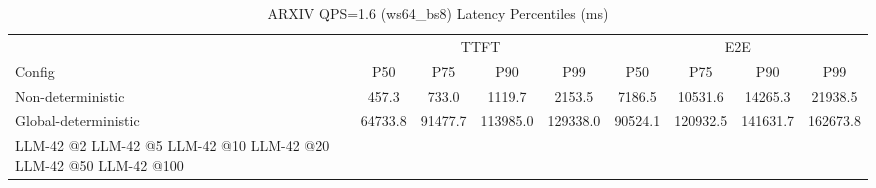 \begin{table}[htbp]
\centering
\caption{ARXIV QPS=1.6 (ws64_bs8) Latency Percentiles (ms)}
\label{tab:arxiv_qps1.6_ws64_bs8}
\begin{tabular}{l|cccc|cccc}
\toprule
& \multicolumn{4}{c|}{TTFT} & \multicolumn{4}{c}{E2E} \\
Config & P50 & P75 & P90 & P99 & P50 & P75 & P90 & P99 \\
\midrule
Non-deterministic & 457.3 & 733.0 & 1119.7 & 2153.5 & 7186.5 & 10531.6 & 14265.3 & 21938.5 \\
Global-deterministic & 64733.8 & 91477.7 & 113985.0 & 129338.0 & 90524.1 & 120932.5 & 141631.7 & 162673.8 \\
LLM-42 @2%
LLM-42 @5%
LLM-42 @10%
LLM-42 @20%
LLM-42 @50%
LLM-42 @100%
\bottomrule
\end{tabular}
\end{table}
